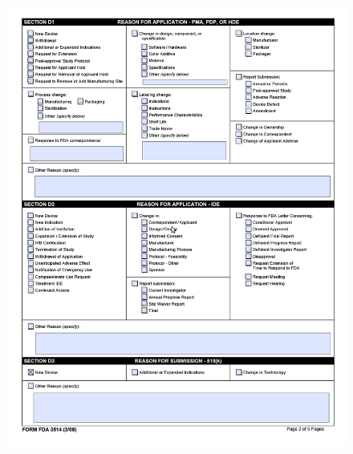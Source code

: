 \begin{figure}[H]
  \centering
  \includegraphics[width=1.2\linewidth]{pages/cdrh-pics/2}
  \label{fig:summary}
\end{figure}

